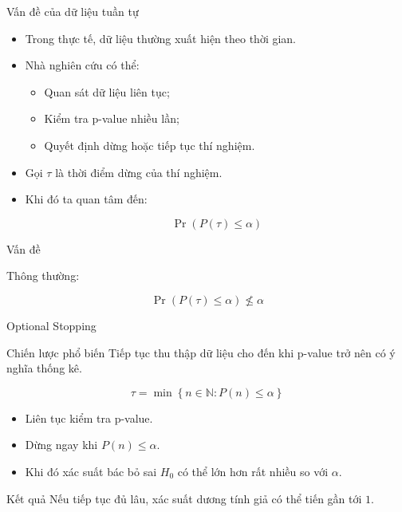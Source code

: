 \begin{frame}{Vấn đề của dữ liệu tuần tự}

\begin{itemize}

\item Trong thực tế, dữ liệu thường xuất hiện theo thời gian.

\item Nhà nghiên cứu có thể:
\begin{itemize}
\item Quan sát dữ liệu liên tục;
\item Kiểm tra p-value nhiều lần;
\item Quyết định dừng hoặc tiếp tục thí nghiệm.
\end{itemize}

\item Gọi $\tau$ là thời điểm dừng của thí nghiệm.

\item Khi đó ta quan tâm đến:

\[
\Pr(P(\tau)\le \alpha)
\]

\end{itemize}

\begin{alertblock}{Vấn đề}

Thông thường:

\[
\Pr(P(\tau)\le \alpha)\nleq \alpha
\]

\end{alertblock}

\end{frame}

\begin{frame}{Optional Stopping}

\begin{block}{Chiến lược phổ biến}
Tiếp tục thu thập dữ liệu cho đến khi p-value trở nên có ý nghĩa thống kê.
\end{block}

\[
\tau=
\min
\left\{
n\in\mathbb{N}:
P(n)\le \alpha
\right\}
\]

\begin{itemize}

\item Liên tục kiểm tra p-value.

\item Dừng ngay khi $P(n)\le \alpha$.

\item Khi đó xác suất bác bỏ sai $H_0$ có thể lớn hơn rất nhiều so với $\alpha$.

\end{itemize}

\begin{alertblock}{Kết quả}
Nếu tiếp tục đủ lâu, xác suất dương tính giả có thể tiến gần tới $1$.
\end{alertblock}

\end{frame}

